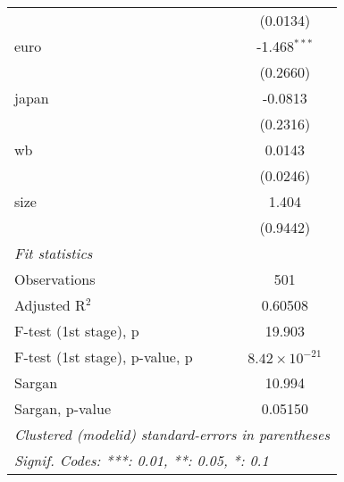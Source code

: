 \begin{tabular}{lc}
                                  & (0.0134)\\   
   euro                           & -1.468$^{***}$\\   
                                  & (0.2660)\\   
   japan                          & -0.0813\\   
                                  & (0.2316)\\   
   wb                             & 0.0143\\   
                                  & (0.0246)\\   
   size                           & 1.404\\   
                                  & (0.9442)\\   
   \midrule
   \emph{Fit statistics}\\
   Observations                   & 501\\  
   Adjusted R$^2$                 & 0.60508\\  
   F-test (1st stage), p          & 19.903\\  
   F-test (1st stage), p-value, p & $8.42\times 10^{-21}$\\   
   Sargan                         & 10.994\\  
   Sargan, p-value                & 0.05150\\  
   \midrule \midrule
   \multicolumn{2}{l}{\emph{Clustered (modelid) standard-errors in parentheses}}\\
   \multicolumn{2}{l}{\emph{Signif. Codes: ***: 0.01, **: 0.05, *: 0.1}}\\
\end{tabular}
\par\endgroup


